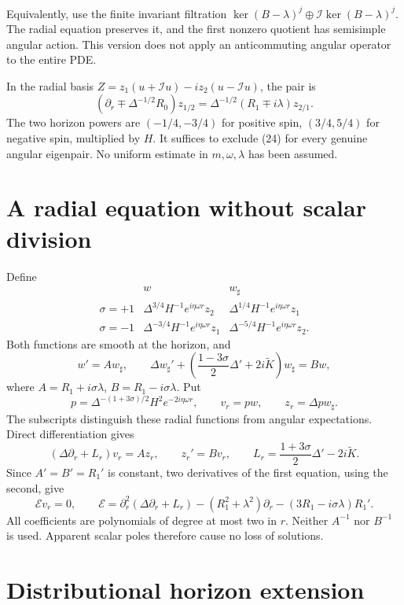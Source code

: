 \documentclass[
  10pt,
  a4paper,
]{article}
\begin{document}
Equivalently, use the finite invariant filtration
\(\ker(B-\lambda)^j\oplus\mathcal I\ker(B-\lambda)^j\). The radial
equation preserves it, and the first nonzero quotient has semisimple
angular action. This version does not apply an anticommuting angular
operator to the entire PDE.

In the radial basis \(Z=z_1(u+\mathcal Iu)-iz_2(u-\mathcal Iu)\), the
pair is \[
 (\partial_r\mp\Delta^{-1/2}R_0)z_{1/2}
 =\Delta^{-1/2}(R_1\mp i\lambda)z_{2/1}.
 \tag{24}
\] The two horizon powers are \((-1/4,-3/4)\) for positive spin,
\((3/4,5/4)\) for negative spin, multiplied by \(H\). It suffices to
exclude (24) for every genuine angular eigenpair. No uniform estimate in
\(m,\omega,\lambda\) has been assumed.

\section{A radial equation without scalar
division}\label{a-radial-equation-without-scalar-division}

Define \[
\begin{array}{c|cc}
 &w&w_\sharp\\ \hline
 \sigma=+1&
 \Delta^{3/4}H^{-1}e^{i\eta\omega r}z_2&
 \Delta^{1/4}H^{-1}e^{i\eta\omega r}z_1\\
 \sigma=-1&
 \Delta^{-3/4}H^{-1}e^{i\eta\omega r}z_1&
 \Delta^{-5/4}H^{-1}e^{i\eta\omega r}z_2 .
\end{array}
 \tag{25}
\] Both functions are smooth at the horizon, and \[
 w'=A w_\sharp,\qquad
 \Delta w_\sharp'+
 \left(\frac{1-3\sigma}{2}\Delta'+2i\widetilde K\right)w_\sharp=B w,
 \tag{26}
\] where \(A=R_1+i\sigma\lambda\), \(B=R_1-i\sigma\lambda\). Put \[
 p=\Delta^{-(1+3\sigma)/2}H^2e^{-2i\eta\omega r},\qquad
 v_r=pw,\qquad z_r=\Delta p w_\sharp .
 \tag{27}
\] The subscripts distinguish these radial functions from angular
expectations. Direct differentiation gives \[
 (\Delta\partial_r+L_r)v_r=A z_r,\qquad z_r'=Bv_r,\qquad
 L_r=\frac{1+3\sigma}{2}\Delta'-2i\widetilde K .
 \tag{28}
\] Since \(A'=B'=R_1'\) is constant, two derivatives of the first
equation, using the second, give \[
 \mathcal E v_r=0,\qquad
 \mathcal E=
 \partial_r^2(\Delta\partial_r+L_r)
 -(R_1^2+\lambda^2)\partial_r-(3R_1-i\sigma\lambda)R_1' .
 \tag{29}
\] All coefficients are polynomials of degree at most two in \(r\).
Neither \(A^{-1}\) nor \(B^{-1}\) is used. Apparent scalar poles
therefore cause no loss of solutions.

\section{Distributional horizon
extension}\label{distributional-horizon-extension}
\end{document}
